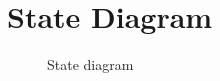 \documentclass[a4paper]{article}
\begin{document}
\section{State Diagram}
\begin{figure}[h!]
	\centering
	\caption{State diagram}
\end{figure}
\clearpage
\end{document}
